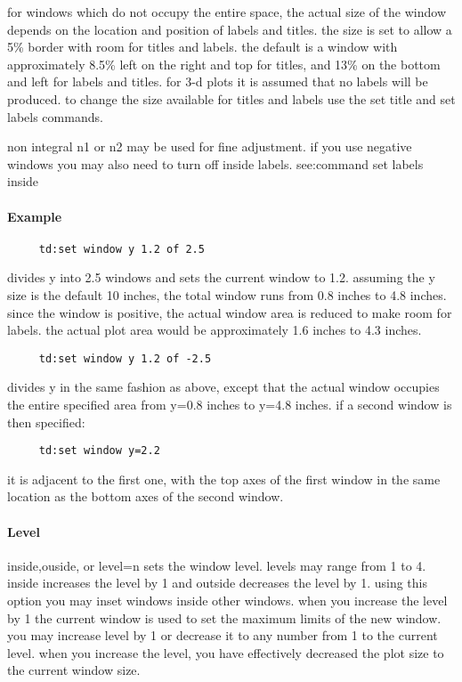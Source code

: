 for  windows which do not occupy the entire space, the actual size of
the window depends on the location and position of labels and titles.
the size is set to allow a 5\% border with room for titles and labels.
the default is a window with approximately 8.5\% left on the right and
top for titles, and 13\% on the bottom and left for labels and titles.
for 3-d plots it is assumed that no  labels  will  be  produced.   to
change the size available for titles and labels use the set title and
set labels commands.  

non  integral  n1  or n2 may be used for fine adjustment.  if you use
negative windows you  may  also  need  to  turn  off  inside  labels.
see:command set labels inside 
\paragraph{Example}
\begin{verbatim}
     td:set window y 1.2 of 2.5 
\end{verbatim}
divides  y  into  2.5  windows  and sets the current window to 1.2.
assuming the y size is the default 10 inches, the total window runs
from  0.8  inches to 4.8 inches.  since the window is positive, the
actual window area is reduced to make room for labels.  the  actual
plot area would be approximately 1.6 inches to 4.3 inches.  
\begin{verbatim}
     td:set window y 1.2 of -2.5 
\end{verbatim}
divides  y  in  the  same  fashion as above, except that the actual
window occupies the entire specified  area  from  y=0.8  inches  to
y=4.8 inches.  if a second window is then specified:  
\begin{verbatim}
     td:set window y=2.2 
\end{verbatim}
it  is  adjacent  to  the first one, with the top axes of the first
window in the same location  as  the  bottom  axes  of  the  second
window.  
\paragraph{Level}
inside,ouside,  or  level=n  sets the window level.  levels may range
from 1 to 4.  inside increases the level by 1 and  outside  decreases
the level by 1.  using this option you may inset windows inside other
windows.  when you increase the level by 1 the current window is used
to  set the maximum limits of the new window.  you may increase level
by 1 or decrease it to any number from 1 to the current level.   when
you  increase the level, you have effectively decreased the plot size
to the current window size.  

